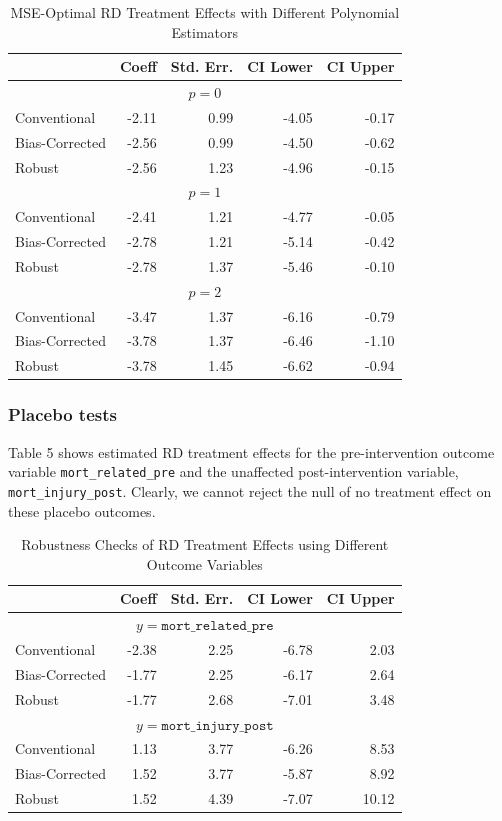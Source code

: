 \documentclass[12pt]{article}
\begin{document}
\begin{table}[htpb!]
\centering
\caption{MSE-Optimal RD Treatment Effects with Different Polynomial Estimators}
\begin{tabular}{lrrrr}
  \hline
 & Coeff & Std. Err. & CI Lower & CI Upper \\ 
  \hline
  \multicolumn{5}{c}{$p=0$}\\
  \hline
Conventional & -2.11 & 0.99 & -4.05 & -0.17 \\ 
  Bias-Corrected & -2.56 & 0.99 & -4.50 & -0.62 \\ 
  Robust & -2.56 & 1.23 & -4.96 & -0.15 \\ 
   \hline
   \multicolumn{5}{c}{$p=1$}\\
     \hline
Conventional & -2.41 & 1.21 & -4.77 & -0.05 \\ 
  Bias-Corrected & -2.78 & 1.21 & -5.14 & -0.42 \\ 
  Robust & -2.78 & 1.37 & -5.46 & -0.10 \\ 
   \hline
\multicolumn{5}{c}{$p=2$}\\
     \hline
Conventional & -3.47 & 1.37 & -6.16 & -0.79 \\ 
  Bias-Corrected & -3.78 & 1.37 & -6.46 & -1.10 \\ 
  Robust & -3.78 & 1.45 & -6.62 & -0.94 \\ 
   \hline
\end{tabular}
\end{table}

\subsubsection{Placebo tests}
Table 5 shows estimated RD treatment effects for the pre-intervention outcome variable \verb|mort_related_pre| and the unaffected post-intervention variable, \verb|mort_injury_post|. Clearly, we cannot reject the null of no treatment effect on these placebo outcomes.

\begin{table}[htpb!]
\centering
\caption{Robustness Checks of RD Treatment Effects using Different Outcome Variables}
\begin{tabular}{lrrrr}
  \hline
 & Coeff & Std. Err. & CI Lower & CI Upper \\ 
  \hline
  \multicolumn{5}{c}{$y= \texttt{mort\_related\_pre}$}\\
  \hline
Conventional & -2.38 & 2.25 & -6.78 & 2.03 \\ 
  Bias-Corrected & -1.77 & 2.25 & -6.17 & 2.64 \\ 
  Robust & -1.77 & 2.68 & -7.01 & 3.48 \\ 
   \hline
 \multicolumn{5}{c}{$y= \texttt{mort\_injury\_post}$}\\
     \hline
Conventional & 1.13 & 3.77 & -6.26 & 8.53 \\ 
  Bias-Corrected & 1.52 & 3.77 & -5.87 & 8.92 \\ 
  Robust & 1.52 & 4.39 & -7.07 & 10.12 \\
   \hline
\end{tabular}
\end{table}
\end{document}
